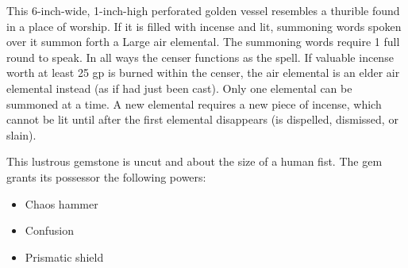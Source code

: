 {

\begin{comment}
Carpet of Flying:} This rug is able to fly through the air as if affected by an overland flight spell of unlimited duration. The size, carrying capacity, and speed of the different carpets of flying are shown on the table below. Beautifully and intricately made, each carpet has its own command word to activate it - if the device is within voice range, the command word activates it, whether the speaker is on the rug or not. The carpet is then controlled by spoken directions.

Size & Capacity & Speed & Weight & Market Price \\
5 ft. by 5 ft. & 200 lb. & 40 ft. & 8 lb. & 20,000 gp \\
5 ft. by 10 ft. & 400 lb. & 40 ft. & 15 lb. & 35,000 gp \\
10 ft. by 10 ft. & 800 lb. & 40 ft. & 10 lb. & 60,000 gp &

A carpet of flying can carry up to double its capacity, but doing so reduces its speed to 30 feet. It has average maneuverability, but a carpet of flying can still hover.

Moderate transmutation; CL 10th; Craft Wondrous Item, overland flight, permanency.
\end{comment}

 This 6-inch-wide, 1-inch-high perforated golden vessel resembles a thurible found in a place of worship. If it is filled with incense and lit, summoning words spoken over it summon forth a Large air elemental. The summoning words require 1 full round to speak. In all ways the censer functions as the  spell. If valuable incense worth at least 25 gp is burned within the censer, the air elemental is an elder air elemental instead (as if  had just been cast). Only one elemental can be summoned at a time. A new elemental requires a new piece of incense, which cannot be lit until after the first elemental disappears (is dispelled, dismissed, or slain).


 This lustrous gemstone is uncut and about the size of a human fist. The gem grants its possessor the following powers:
\begin{itemize}
\item Chaos hammer
\item Confusion
\item Prismatic shield
\end{itemize}

}
